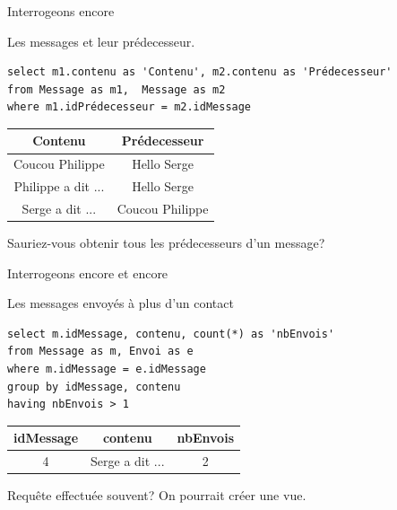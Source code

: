 \begin{frame}[fragile]{Interrogeons encore}

Les messages et leur prédecesseur.

\begin{verbatim}
select m1.contenu as 'Contenu', m2.contenu as 'Prédecesseur'
from Message as m1,  Message as m2
where m1.idPrédecesseur = m2.idMessage
\end{verbatim}

\vfill
\begin{small}
\begin{tabular}{c|c}
\textbf{Contenu} & \textbf{Prédecesseur}\\ \hline 
Coucou Philippe & Hello Serge\\ \hline 
Philippe a dit ... & Hello Serge\\ \hline 
Serge a dit ... & Coucou Philippe\\ \hline 
\end{tabular}
\end{small}
\vfill

Sauriez-vous obtenir \alert{tous} les prédecesseurs
d'un message?
\end{frame}


\begin{frame}[fragile]{Interrogeons encore et encore}

Les messages envoyés à plus d'un contact

\begin{verbatim}
select m.idMessage, contenu, count(*) as 'nbEnvois'
from Message as m, Envoi as e
where m.idMessage = e.idMessage
group by idMessage, contenu
having nbEnvois > 1
\end{verbatim}

\vfill

\begin{tabular}{c|c|c}
\textbf{idMessage} & \textbf{contenu} & \textbf{nbEnvois}\\ \hline 
4 & Serge a dit ... & 2\\ \hline 
\end{tabular}

\vfill

Requête effectuée souvent? On pourrait créer une vue.
\end{frame}


